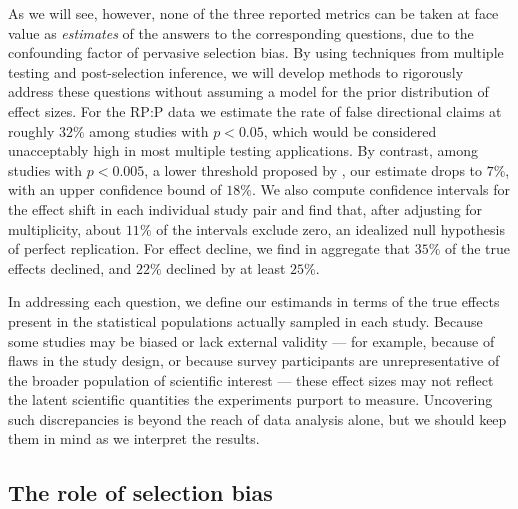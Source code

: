 \documentclass[aoas, preprint]{imsart}
\theoremstyle{definition}
\theoremstyle{custom}
\begin{document}
  As we will see, however, none of the three reported metrics can be taken at face value as {\em estimates} of the answers to the corresponding questions, due to the confounding factor of pervasive selection bias. By using techniques from multiple testing and post-selection inference, we will develop methods to rigorously address these questions without assuming a model for the prior distribution of effect sizes. For the RP:P data we estimate the rate of false directional claims at roughly $32\%$ among studies with $p < 0.05$, which would be considered unacceptably high in most multiple testing applications. By contrast, among studies with $p < 0.005$, a lower threshold proposed by \citet{Benjamin:2018gh}, our estimate drops to $7\%$, with an upper confidence bound of $18\%$. We also compute confidence intervals for the effect shift in each individual study pair and find that, after adjusting for multiplicity, about $11\%$ of the intervals exclude zero, an idealized null hypothesis of perfect replication. For effect decline, we find in aggregate that $35\%$ of the true effects declined, and $22\%$ declined by at least $25\%$.

  In addressing each question, we define our estimands in terms of the true effects present in the statistical populations actually sampled in each study. Because some studies may be biased or lack external validity --- for example, because of flaws in the study design, or because survey participants are unrepresentative of the broader population of scientific interest --- these effect sizes may not reflect the latent scientific quantities the experiments purport to measure. Uncovering such discrepancies is beyond the reach of data analysis alone, but we should keep them in mind as we interpret the results.

\subsection{The role of selection bias}
\end{document}
